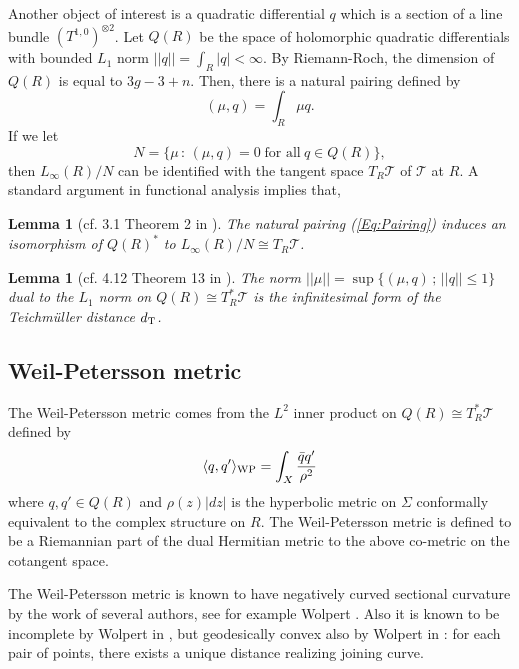 \documentclass[11pt,reqno]{amsart}
\newtheorem{lemma}[theorem]{{\bf Lemma}}
\numberwithin{equation}{section}
\begin{document}
Another object of interest is a quadratic differential  $q$  
which is a section of a line bundle  $(T^{1,0})^{\otimes 2}$.  
Let  $Q(R)$  be the space of holomorphic quadratic differentials 
with bounded  $L_1$  norm  $|| q || = \int_R |q| < \infty$.  
By Riemann-Roch, 
the dimension of  $Q(R)$  is equal to  $3g-3+n$.  
Then, 
there is a natural pairing defined by 
\begin{equation}\label{Eq:Pairing}
	(\mu, q) = \int_R \mu q.  
\end{equation}  
If we let  
\begin{equation*} 
	N = \{ \mu \, : \, (\mu, q) = 0 \; \text{for all} \: q \in Q(R) \}, 
\end{equation*}  
then  $L_{\infty} (R)/N$  can be identified with the tangent space  $T_R \mathcal{T}$   
of  $\mathcal{T}$  at  $R$.  
A standard argument in functional analysis implies that, 

\begin{lemma}[cf. 3.1 Theorem 2 in \cite{GL}]\label{Lem:NaturalParing}
The natural pairing  {\em (\ref{Eq:Pairing})}  induces 
an isomorphism of  $Q(R)^*$  to  $L_{\infty}(R)/N \cong T_R \mathcal{T}$.  
\end{lemma}

\begin{lemma}[cf. 4.12 Theorem 13 in \cite{GL}]\label{Lem:InfinitesimalTeichmuller} 
	The norm  $|| \mu || = \sup \{ (\mu, q) \, ; \, || q || \leq 1\}$  dual to 
	the  $L_1$ norm on  $Q(R) \cong T_{R}^*\mathcal{T}$  is 
	the infinitesimal form of the Teichm\"uller distance  $d_{\rm T}$.    
\end{lemma}

\subsection{Weil-Petersson metric} 

The Weil-Petersson metric comes from the  $L^2$  inner product 
on  $Q(R) \cong T_R^* \mathcal{T}$  defined by 
\begin{equation*}
	\langle q, q'  \rangle_{{\rm WP}} = \int_X \frac{\bar{q} q'}{\rho^2} 
\end{equation*}
where  $q, q'  \in Q(R)$  and 
$\rho(z) |dz|$  is the hyperbolic metric on  $\varSigma$  
conformally equivalent to the complex structure on  $R$.  
The Weil-Petersson metric is defined to be a Riemannian part of 
the dual Hermitian metric to the above co-metric 
on the cotangent space.  

The Weil-Petersson metric is known to have negatively curved 
sectional curvature by the work of several authors, 
see for example Wolpert \cite{Wolpert1}.   
Also it is known to be incomplete by Wolpert in  \cite{Wolpert0}, 
but geodesically convex also by Wolpert in  \cite{Wolpert2} : 
for each pair of points, 
there exists a unique distance realizing joining curve.  
\end{document}
